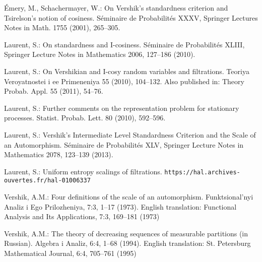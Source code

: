 \documentclass[12pt,a4paper]{article}
\begin{document}
\begin{thebibliography}{99.}

 \'{E}mery, M.,  Schachermayer, W.: 
On Vershik's standardness criterion and Tsirelson's  notion of cosiness. 
 S\'eminaire de Probabilit\'es XXXV,  
Springer Lectures Notes in Math. 1755 (2001), 
265--305.

 Laurent, S.: 
On standardness and I-cosiness. S\'eminaire de Probabilit\'es XLIII, 
Springer Lecture Notes in Mathematics 2006, 
127--186 (2010).

 Laurent, S.: 
On Vershikian and I-cosy random variables and filtrations.
Teoriya Veroyatnostei i ee Primeneniya 55 (2010), 104--132. 
Also published in: Theory Probab. Appl. 55 (2011), 54--76.

Laurent, S.: 
Further comments on the representation problem for stationary processes. 
Statist. Probab. Lett. 80 (2010),  592--596. 

Laurent, S.: 
Vershik's Intermediate Level Standardness Criterion and the Scale of an Automorphism. 
S\'eminaire de Probabilit\'es XLV,
Springer Lecture Notes in Mathematics 2078,
123--139 (2013).

Laurent, S.: 
Uniform entropy scalings of filtrations. 
\verb+https://hal.archives-ouvertes.fr/hal-01006337+ 

Vershik, A.M.: 
Four definitions of the scale of an automorphism. 
Funktsional'nyi Analiz i Ego Prilozheniya, 7:3, 
1--17 (1973). 
English translation:    
Functional Analysis and Its Applications, 7:3, 169--181 (1973)

Vershik, A.M.: 
The theory of decreasing sequences of measurable partitions (in Russian). 
 Algebra i Analiz,  6:4, 1--68 (1994). 
English translation:  St. Petersburg Mathematical Journal, 6:4, 705--761 (1995)


\end{thebibliography}
\end{document}
